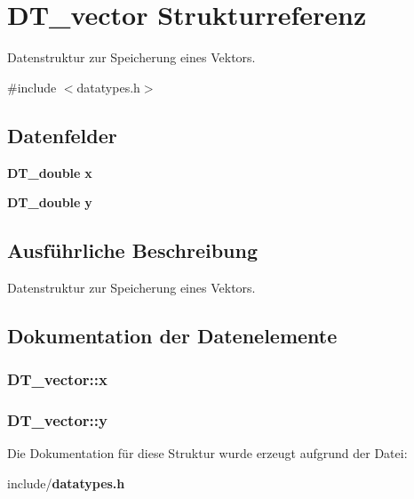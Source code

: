 \section{DT\_\-vector Strukturreferenz}
\label{struct_d_t__vector}


Datenstruktur zur Speicherung eines Vektors.  




{\ttfamily \#include $<$datatypes.h$>$}

\subsection*{Datenfelder}
\begin{DoxyCompactItemize}
\item 
{\bf DT\_\-double} {\bf x}
\item 
{\bf DT\_\-double} {\bf y}
\end{DoxyCompactItemize}


\subsection{Ausführliche Beschreibung}
Datenstruktur zur Speicherung eines Vektors. 

\subsection{Dokumentation der Datenelemente}
\subsubsection[{x}]{ {\bf DT\_\-vector::x}}\label{struct_d_t__vector_a73642a4e289704c7b3b4a333431ee40e}
\subsubsection[{y}]{ {\bf DT\_\-vector::y}}\label{struct_d_t__vector_adbea76797b44c2dd3b9cb036b6f46535}


Die Dokumentation für diese Struktur wurde erzeugt aufgrund der Datei:\begin{DoxyCompactItemize}
\item 
include/{\bf datatypes.h}\end{DoxyCompactItemize}
